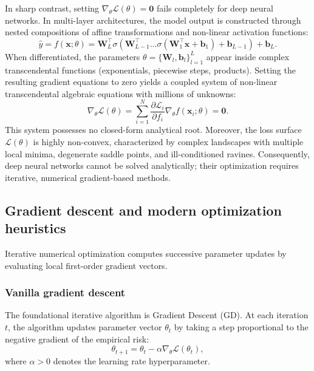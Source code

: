 \documentclass[../../main.tex]{subfiles}
\begin{document}
In sharp contrast, setting $\nabla_\theta \mathcal{L}(\theta) = \mathbf{0}$ fails completely for deep neural networks. In multi-layer architectures, the model output is constructed through nested compositions of affine transformations and non-linear activation functions:
\begin{equation}
\hat{y} = f(\mathbf{x}; \theta) = \mathbf{W}_L^\top \sigma\left( \mathbf{W}_{L-1}^\top \dots \sigma\left( \mathbf{W}_1^\top \mathbf{x} + \mathbf{b}_1 \right) + \mathbf{b}_{L-1} \right) + \mathbf{b}_L.
\end{equation}
When differentiated, the parameters $\theta = \{\mathbf{W}_l, \mathbf{b}_l\}_{l=1}^L$ appear inside complex transcendental functions (exponentials, piecewise steps, products). Setting the resulting gradient equations to zero yields a coupled system of non-linear transcendental algebraic equations with millions of unknowns:
\begin{equation}
\nabla_\theta \mathcal{L}(\theta) = \sum_{i=1}^N \frac{\partial \mathcal{L}_i}{\partial f_i} \nabla_\theta f(\mathbf{x}_i; \theta) = \mathbf{0}.
\end{equation}
This system possesses no closed-form analytical root. Moreover, the loss surface $\mathcal{L}(\theta)$ is highly non-convex, characterized by complex landscapes with multiple local minima, degenerate saddle points, and ill-conditioned ravines. Consequently, deep neural networks cannot be solved analytically; their optimization requires iterative, numerical gradient-based methods.

\subsection{Gradient descent and modern optimization heuristics}
\label{subsec:gradient_descent_heuristics}

Iterative numerical optimization computes successive parameter updates by evaluating local first-order gradient vectors.

\subsubsection{Vanilla gradient descent}

The foundational iterative algorithm is Gradient Descent (GD). At each iteration $t$, the algorithm updates parameter vector $\theta_t$ by taking a step proportional to the negative gradient of the empirical risk:
\begin{equation}
\theta_{t+1} = \theta_t - \alpha \nabla_\theta \mathcal{L}(\theta_t),
\end{equation}
where $\alpha > 0$ denotes the learning rate hyperparameter.
\end{document}
